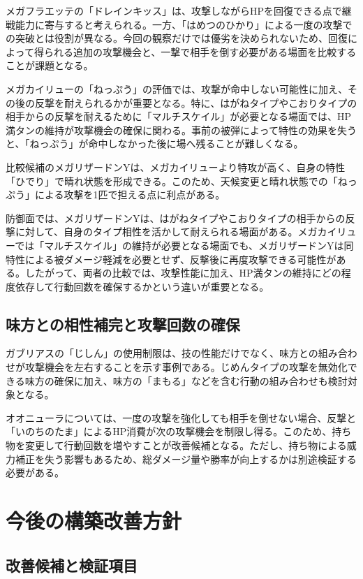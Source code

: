 \documentclass[a4paper,10pt]{ltjsarticle}
\begin{document}
メガフラエッテの「ドレインキッス」は、攻撃しながらHPを回復できる点で継戦能力に寄与すると考えられる。一方、「はめつのひかり」による一度の攻撃での突破とは役割が異なる。今回の観察だけでは優劣を決められないため、回復によって得られる追加の攻撃機会と、一撃で相手を倒す必要がある場面を比較することが課題となる。

メガカイリューの「ねっぷう」の評価では、攻撃が命中しない可能性に加え、その後の反撃を耐えられるかが重要となる。特に、はがねタイプやこおりタイプの相手からの反撃を耐えるために「マルチスケイル」が必要となる場面では、HP満タンの維持が攻撃機会の確保に関わる。事前の被弾によって特性の効果を失うと、「ねっぷう」が命中しなかった後に場へ残ることが難しくなる。

比較候補のメガリザードンYは、メガカイリューより特攻が高く、自身の特性「ひでり」で晴れ状態を形成できる。このため、天候変更と晴れ状態での「ねっぷう」による攻撃を1匹で担える点に利点がある。

防御面では、メガリザードンYは、はがねタイプやこおりタイプの相手からの反撃に対して、自身のタイプ相性を活かして耐えられる場面がある。メガカイリューでは「マルチスケイル」の維持が必要となる場面でも、メガリザードンYは同特性による被ダメージ軽減を必要とせず、反撃後に再度攻撃できる可能性がある。したがって、両者の比較では、攻撃性能に加え、HP満タンの維持にどの程度依存して行動回数を確保するかという違いが重要となる。

\subsection{味方との相性補完と攻撃回数の確保}

ガブリアスの「じしん」の使用制限は、技の性能だけでなく、味方との組み合わせが攻撃機会を左右することを示す事例である。じめんタイプの攻撃を無効化できる味方の確保に加え、味方の「まもる」などを含む行動の組み合わせも検討対象となる。

オオニューラについては、一度の攻撃を強化しても相手を倒せない場合、反撃と「いのちのたま」によるHP消費が次の攻撃機会を制限し得る。このため、持ち物を変更して行動回数を増やすことが改善候補となる。ただし、持ち物による威力補正を失う影響もあるため、総ダメージ量や勝率が向上するかは別途検証する必要がある。

\section{今後の構築改善方針}
\subsection{改善候補と検証項目}
\end{document}
